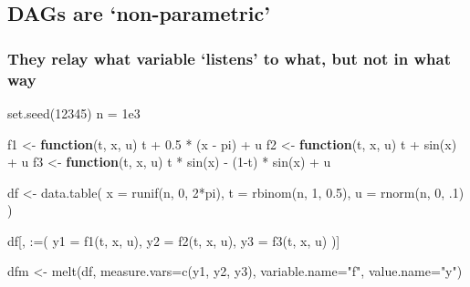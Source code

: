 \documentclass[
  letterpaper,
  DIV=11,
  numbers=noendperiod]{scrartcl}
\newenvironment{Shaded}{\begin{snugshade}}{\end{snugshade}}
\newcommand{\AttributeTok}[1]{\textcolor[rgb]{0.40,0.45,0.13}{#1}}
\newcommand{\ControlFlowTok}[1]{\textcolor[rgb]{0.00,0.23,0.31}{\textbf{#1}}}
\newcommand{\DecValTok}[1]{\textcolor[rgb]{0.68,0.00,0.00}{#1}}
\newcommand{\FloatTok}[1]{\textcolor[rgb]{0.68,0.00,0.00}{#1}}
\newcommand{\FunctionTok}[1]{\textcolor[rgb]{0.28,0.35,0.67}{#1}}
\newcommand{\NormalTok}[1]{\textcolor[rgb]{0.00,0.23,0.31}{#1}}
\newcommand{\OtherTok}[1]{\textcolor[rgb]{0.00,0.23,0.31}{#1}}
\newcommand{\SpecialCharTok}[1]{\textcolor[rgb]{0.37,0.37,0.37}{#1}}
\newcommand{\StringTok}[1]{\textcolor[rgb]{0.13,0.47,0.30}{#1}}
\begin{document}
\subsection{DAGs are `non-parametric'}\label{dags-are-non-parametric}

\subsubsection{They relay what variable `listens' to what, but not in
what
way}\label{they-relay-what-variable-listens-to-what-but-not-in-what-way}

\begin{Shaded}
\begin{Highlighting}[]
\FunctionTok{set.seed}\NormalTok{(}\DecValTok{12345}\NormalTok{)}
\NormalTok{n }\OtherTok{=} \FloatTok{1e3}

\NormalTok{f1 }\OtherTok{\textless{}{-}} \ControlFlowTok{function}\NormalTok{(t, x, u) t }\SpecialCharTok{+} \FloatTok{0.5} \SpecialCharTok{*}\NormalTok{ (x }\SpecialCharTok{{-}}\NormalTok{ pi) }\SpecialCharTok{+}\NormalTok{ u}
\NormalTok{f2 }\OtherTok{\textless{}{-}} \ControlFlowTok{function}\NormalTok{(t, x, u) t }\SpecialCharTok{+} \FunctionTok{sin}\NormalTok{(x) }\SpecialCharTok{+}\NormalTok{ u}
\NormalTok{f3 }\OtherTok{\textless{}{-}} \ControlFlowTok{function}\NormalTok{(t, x, u) t }\SpecialCharTok{*} \FunctionTok{sin}\NormalTok{(x) }\SpecialCharTok{{-}}\NormalTok{ (}\DecValTok{1}\SpecialCharTok{{-}}\NormalTok{t) }\SpecialCharTok{*} \FunctionTok{sin}\NormalTok{(x) }\SpecialCharTok{+}\NormalTok{ u}

\NormalTok{df }\OtherTok{\textless{}{-}} \FunctionTok{data.table}\NormalTok{(}
  \AttributeTok{x =} \FunctionTok{runif}\NormalTok{(n, }\DecValTok{0}\NormalTok{, }\DecValTok{2}\SpecialCharTok{*}\NormalTok{pi),}
  \AttributeTok{t =} \FunctionTok{rbinom}\NormalTok{(n, }\DecValTok{1}\NormalTok{, }\FloatTok{0.5}\NormalTok{),}
  \AttributeTok{u =} \FunctionTok{rnorm}\NormalTok{(n, }\DecValTok{0}\NormalTok{, .}\DecValTok{1}\NormalTok{)}
\NormalTok{)}

\NormalTok{df[, }\StringTok{\textasciigrave{}}\AttributeTok{:=}\StringTok{\textasciigrave{}}\NormalTok{(}
  \AttributeTok{y1 =} \FunctionTok{f1}\NormalTok{(t, x, u),}
  \AttributeTok{y2 =} \FunctionTok{f2}\NormalTok{(t, x, u),}
  \AttributeTok{y3 =} \FunctionTok{f3}\NormalTok{(t, x, u)}
\NormalTok{)]}

\NormalTok{dfm }\OtherTok{\textless{}{-}} \FunctionTok{melt}\NormalTok{(df, }\AttributeTok{measure.vars=}\FunctionTok{c}\NormalTok{(}\StringTok{\textquotesingle{}y1\textquotesingle{}}\NormalTok{, }\StringTok{\textquotesingle{}y2\textquotesingle{}}\NormalTok{, }\StringTok{\textquotesingle{}y3\textquotesingle{}}\NormalTok{),}
            \AttributeTok{variable.name=}\StringTok{"f"}\NormalTok{, }\AttributeTok{value.name=}\StringTok{"y"}\NormalTok{)}


\end{Highlighting}
\end{Shaded}
\end{document}
